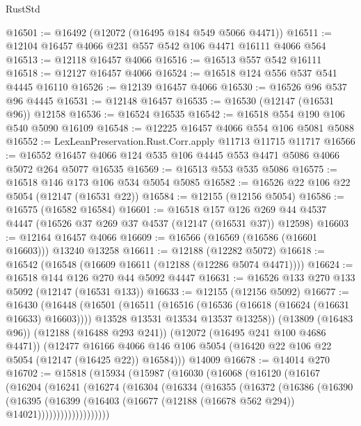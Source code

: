 \begin{lexlean}{RustStd}
\begin{coremodule}
@16501 := @16492 (@12072 (@16495 @184 @549 @5066 @4471))
@16511 := @12104 @16457 @4066 @231 @557 @542 @106 @4471 @16111 @4066 @564
@16513 := @12118 @16457 @4066
@16516 := @16513 @557 @542 @16111
@16518 := @12127 @16457 @4066
@16524 := @16518 @124 @556 @537 @541 @4445 @16110
@16526 := @12139 @16457 @4066
@16530 := @16526 @96 @537 @96 @4445
@16531 := @12148 @16457
@16535 := @16530 (@12147 (@16531 @96)) @12158
@16536 := @16524 @16535
@16542 := @16518 @554 @190 @106 @540 @5090 @16109
@16548 := @12225 @16457 @4066 @554 @106 @5081 @5088
@16552 := LexLeanPreservation.Rust.Corr.apply @11713 @11715 @11717
@16566 := @16552 @16457 @4066 @124 @535 @106 @4445 @553 @4471 @5086 @4066 @5072 @264 @5077 @16535
@16569 := @16513 @553 @535 @5086
@16575 := @16518 @146 @173 @106 @534 @5054 @5085
@16582 := @16526 @22 @106 @22 @5054 (@12147 (@16531 @22))
@16584 := @12155 (@12156 @5054)
@16586 := @16575 (@16582 @16584)
@16601 := @16518
    @157
    @126
    @269
    @44
    @4537
    @4447
    (@16526 @37 @269 @37 @4537 (@12147 (@16531 @37)) @12598)
@16603 := @12164 @16457 @4066
@16609 := @16566 (@16569 (@16586 (@16601 @16603))) @13240 @13258
@16611 := @12188 (@12282 @5072)
@16618 := @16542 (@16548 (@16609 @16611 (@12188 (@12286 @5074 @4471))))
@16624 := @16518 @144 @126 @270 @44 @5092 @4447
@16631 := @16526 @133 @270 @133 @5092 (@12147 (@16531 @133))
@16633 := @12155 (@12156 @5092)
@16677 := @16430
    (@16448
      (@16501
        (@16511
          (@16516 (@16536 (@16618 (@16624 (@16631 @16633) @16603))))
          @13528
          @13531
          @13534
          @13537
          @13258))
      (@13809 (@16483 @96))
      (@12188 (@16488 @293 @241))
      (@12072 (@16495 @241 @100 @4686 @4471))
      (@12477
        @16166
        @4066
        @146
        @106
        @5054
        (@16420 @22 @106 @22 @5054 (@12147 (@16425 @22)) @16584)))
    @14009
@16678 := @14014 @270
@16702 := @15818
    (@15934
      (@15987
        (@16030
          (@16068
            (@16120
              (@16167
                (@16204
                  (@16241
                    (@16274
                      (@16304
                        (@16334
                          (@16355
                            (@16372
                              (@16386
                                (@16390
                                  (@16395
                                    (@16399
                                      (@16403
                                        (@16677
                                          (@12188 (@16678 @562 @294))
                                          @14021)))))))))))))))))))

\end{coremodule}
\end{lexlean}
